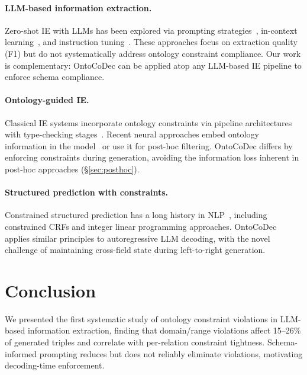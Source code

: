 \documentclass[11pt,a4paper]{article}
\newcommand{\sys}{OntoCoDec\xspace}
\begin{document}
\paragraph{LLM-based information extraction.}
Zero-shot IE with LLMs has been explored via prompting strategies~\citep{wei2023zeroshot}, in-context learning~\citep{li2023evaluating}, and instruction tuning~\citep{wang2023instructuie}.
These approaches focus on extraction quality (F1) but do not systematically address ontology constraint compliance.
Our work is complementary: \sys can be applied atop any LLM-based IE pipeline to enforce schema compliance.

\paragraph{Ontology-guided IE.}
Classical IE systems incorporate ontology constraints via pipeline architectures with type-checking stages~\citep{ling2012fine}.
Recent neural approaches embed ontology information in the model~\citep{chen2021knowprompt} or use it for post-hoc filtering.
\sys differs by enforcing constraints during generation, avoiding the information loss inherent in post-hoc approaches (\S\ref{sec:posthoc}).

\paragraph{Structured prediction with constraints.}
Constrained structured prediction has a long history in NLP~\citep{rush2012tutorial}, including constrained CRFs and integer linear programming approaches.
\sys applies similar principles to autoregressive LLM decoding, with the novel challenge of maintaining cross-field state during left-to-right generation.

\section{Conclusion}

We presented the first systematic study of ontology constraint violations in LLM-based information extraction, finding that domain/range violations affect 15--26\% of generated triples and correlate with per-relation constraint tightness.
Schema-informed prompting reduces but does not reliably eliminate violations, motivating decoding-time enforcement.
\end{document}
